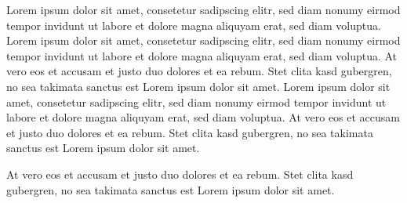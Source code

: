 \documentclass{article}
\begin{document}
Lorem ipsum dolor sit amet, consetetur sadipscing elitr, sed
diam nonumy eirmod tempor invidunt ut labore et dolore magna aliquyam
erat, sed diam voluptua.
\clozeparcmd Lorem ipsum dolor sit amet, consetetur sadipscing elitr, sed
diam nonumy eirmod tempor invidunt ut labore et dolore magna aliquyam
erat, sed diam voluptua. At vero eos et accusam et justo duo dolores et
ea rebum. Stet clita kasd gubergren, no sea takimata sanctus est Lorem
ipsum dolor sit amet. Lorem ipsum dolor sit amet, consetetur sadipscing
elitr, sed diam nonumy eirmod tempor invidunt ut labore et dolore magna
aliquyam erat, sed diam voluptua. At vero eos et accusam et justo duo
dolores et ea rebum. Stet clita kasd gubergren, no sea takimata sanctus
est Lorem ipsum dolor sit amet.

At vero eos et accusam et justo duo
dolores et ea rebum. Stet clita kasd gubergren, no sea takimata sanctus
est Lorem ipsum dolor sit amet.
\end{document}
